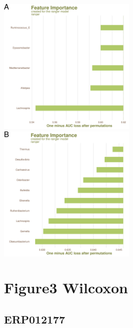 \documentclass[
]{article}
\begin{document}
\includegraphics[width=0.5\textwidth,height=0.5\textheight]{../../Analysis_shotgun_PRJDB4176/03_ML/shotgun/atlas_binning/PRJDB4176_binning_best.model_draw_feature_importance_plot.png}
\includegraphics[width=0.5\textwidth,height=0.5\textheight]{../../Analysis_shotgun_PRJDB4176/03_ML/shotgun/krakens/PRJDB4176_best.model_draw_feature_importance_plot.png}

\hypertarget{figure3-wilcoxon}{%
\section{Figure3 Wilcoxon}\label{figure3-wilcoxon}}

\hypertarget{erp012177-1}{%
\subsection{ERP012177}\label{erp012177-1}}
\end{document}
